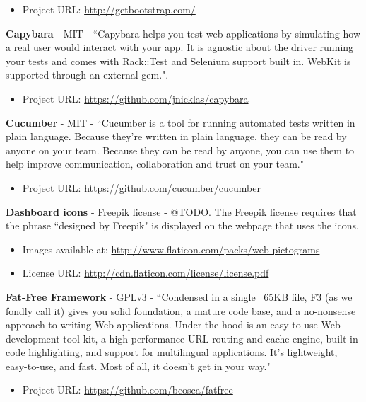 \begin{itemize}
\item Project URL: \url{http://getbootstrap.com/}
\end{itemize}

\textbf{Capybara} - MIT - ``Capybara helps you test web applications by simulating how a real user would interact with your app. It is agnostic about the driver running your tests and comes with Rack::Test and Selenium support built in. WebKit is supported through an external gem.". 

\begin{itemize}
\item Project URL: \url{https://github.com/jnicklas/capybara}
\end{itemize}

\textbf{Cucumber} - MIT - ``Cucumber is a tool for running automated tests written in plain language. Because they're written in plain language, they can be read by anyone on your team. Because they can be read by anyone, you can use them to help improve communication, collaboration and trust on your team."

\begin{itemize}
\item Project URL: \url{https://github.com/cucumber/cucumber}
\end{itemize}

\textbf{Dashboard icons} - Freepik license - @TODO. The Freepik license requires that the phrase ``designed by Freepik" is displayed on the webpage that uses the icons.

\begin{itemize}
\item Images available at: \url{http://www.flaticon.com/packs/web-pictograms}
\item License URL: \url{http://cdn.flaticon.com/license/license.pdf}
\end{itemize}

\textbf{Fat-Free Framework} - GPLv3 - ``Condensed in a single ~65KB file, F3 (as we fondly call it) gives you solid foundation, a mature code base, and a no-nonsense approach to writing Web applications. Under the hood is an easy-to-use Web development tool kit, a high-performance URL routing and cache engine, built-in code highlighting, and support for multilingual applications. It's lightweight, easy-to-use, and fast. Most of all, it doesn't get in your way."

\begin{itemize}
\item Project URL: \url{https://github.com/bcosca/fatfree}
\end{itemize}

